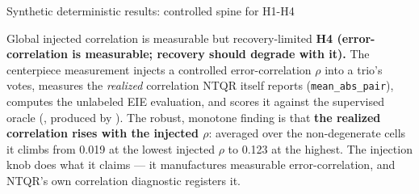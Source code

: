 \documentclass[
  ignorenonframetext,
]{beamer}
\begin{document}
\begin{frame}{Synthetic deterministic results:
controlled spine for H1-H4}
\begin{block}{Global injected correlation is measurable but
recovery-limited}
\protect{}\label{global-injected-correlation-is-measurable-but-recovery-limited}
\textbf{H4 (error-correlation is measurable; recovery should degrade
with it).} The centerpiece measurement injects a controlled
error-correlation \(\rho\) into a trio's votes, measures the
\emph{realized} correlation NTQR itself reports
(\texttt{mean\_abs\_pair}), computes the unlabeled EIE evaluation, and
scores it against the supervised oracle
(, produced by
). The robust,
monotone finding is that \textbf{the realized correlation rises with the
injected \(\rho\)}: averaged over the non-degenerate cells it climbs
from 0.019 at the lowest injected \(\rho\) to 0.123 at the highest. The
injection knob does what it claims --- it manufactures measurable
error-correlation, and NTQR's own correlation diagnostic registers it.


\end{block}
\end{frame}
\end{document}
